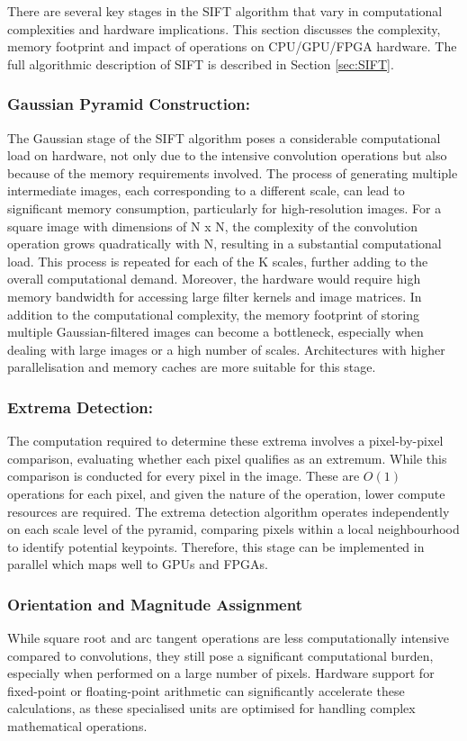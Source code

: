 There are several key stages in the SIFT algorithm that vary in computational complexities and hardware implications. This section discusses the complexity, memory footprint and impact of operations on CPU/GPU/FPGA hardware. The full algorithmic description of SIFT is described in Section \ref{sec:SIFT}.   

\subsubsection{Gaussian Pyramid Construction:}
The Gaussian stage of the SIFT algorithm poses a considerable computational load on hardware, not only due to the intensive convolution operations but also because of the memory requirements involved. The process of generating multiple intermediate images, each corresponding to a different scale, can lead to significant memory consumption, particularly for high-resolution images. For a square image with dimensions of N x N, the complexity of the convolution operation grows quadratically with N, resulting in a substantial computational load. This process is repeated for each of the K scales, further adding to the overall computational demand. Moreover, the hardware would require high memory bandwidth for accessing large filter kernels and image matrices. In addition to the computational complexity, the memory footprint of storing multiple Gaussian-filtered images can become a bottleneck, especially when dealing with large images or a high number of scales. Architectures with higher parallelisation and memory caches are more suitable for this stage.

\subsubsection{Extrema Detection:}
The computation required to determine these extrema involves a pixel-by-pixel comparison, evaluating whether each pixel qualifies as an extremum. While this comparison is conducted for every pixel in the image. These are \(O(1)\) operations for each pixel, and given the nature of the operation, lower compute resources are required. The extrema detection algorithm operates independently on each scale level of the pyramid, comparing pixels within a local neighbourhood to identify potential keypoints. Therefore, this stage can be implemented in parallel which maps well to GPUs and FPGAs.

\subsubsection{Orientation and Magnitude Assignment}
While square root and arc tangent operations are less computationally intensive compared to convolutions, they still pose a significant computational burden, especially when performed on a large number of pixels. Hardware support for fixed-point or floating-point arithmetic can significantly accelerate these calculations, as these specialised units are optimised for handling complex mathematical operations.

